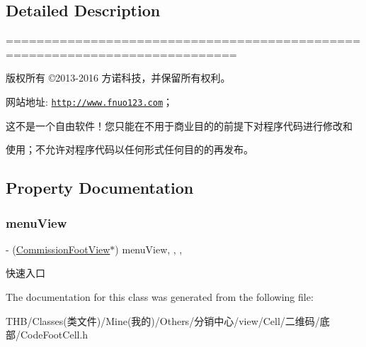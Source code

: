 \subsection{Detailed Description}
============================================================================

版权所有 ©2013-\/2016 方诺科技，并保留所有权利。

网站地址\+: \href{http://www.fnuo123.com}{\tt http\+://www.\+fnuo123.\+com}； 



这不是一个自由软件！您只能在不用于商业目的的前提下对程序代码进行修改和

使用；不允许对程序代码以任何形式任何目的的再发布。 

 

\subsection{Property Documentation}
\mbox{\label{interface_code_foot_cell_a438e285ca44311faf54c54de7315d0ff}} 
\subsubsection{\texorpdfstring{menu\+View}{menuView}}
{\footnotesize\ttfamily -\/ (\mbox{\hyperlink{interface_commission_foot_view}{Commission\+Foot\+View}}$\ast$) menu\+View\hspace{0.3cm}{\ttfamily [read]}, {\ttfamily [write]}, {\ttfamily [nonatomic]}, {\ttfamily [strong]}}

快速入口 

The documentation for this class was generated from the following file\+:\begin{DoxyCompactItemize}
\item 
T\+H\+B/\+Classes(类文件)/\+Mine(我的)/\+Others/分销中心/view/\+Cell/二维码/底部/Code\+Foot\+Cell.\+h\end{DoxyCompactItemize}
